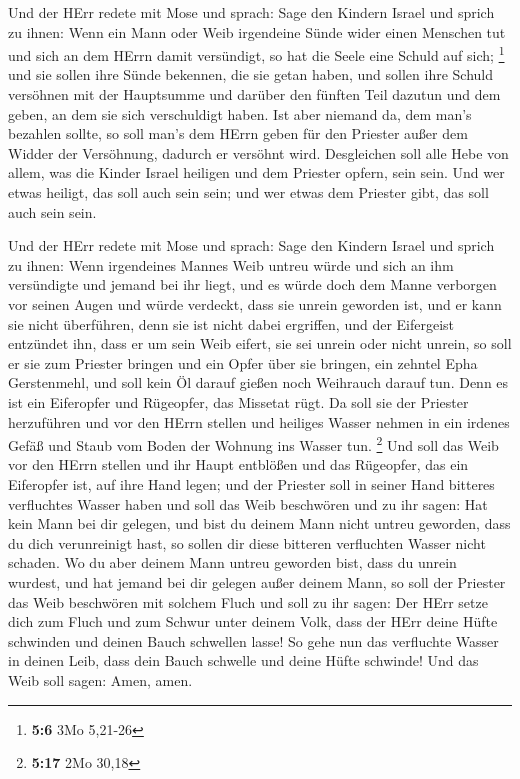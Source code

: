  Und der HErr redete mit Mose und sprach:  Sage
den Kindern Israel und sprich zu ihnen: Wenn ein Mann oder Weib
irgendeine Sünde wider einen Menschen tut und sich an dem HErrn damit
versündigt, so hat die Seele eine Schuld auf sich; \footnote{\textbf{5:6}
  3Mo 5,21-26}  und sie sollen ihre Sünde bekennen, die sie
getan haben, und sollen ihre Schuld versöhnen mit der Hauptsumme und
darüber den fünften Teil dazutun und dem geben, an dem sie sich
verschuldigt haben.  Ist aber niemand da, dem man's bezahlen
sollte, so soll man's dem HErrn geben für den Priester außer dem Widder
der Versöhnung, dadurch er versöhnt wird.  Desgleichen soll
alle Hebe von allem, was die Kinder Israel heiligen und dem Priester
opfern, sein sein.  Und wer etwas heiligt, das soll auch
sein sein; und wer etwas dem Priester gibt, das soll auch sein sein.

 Und der HErr redete mit Mose und sprach: 
Sage den Kindern Israel und sprich zu ihnen: Wenn irgendeines Mannes
Weib untreu würde und sich an ihm versündigte  und jemand
bei ihr liegt, und es würde doch dem Manne verborgen vor seinen Augen
und würde verdeckt, dass sie unrein geworden ist, und er kann sie nicht
überführen, denn sie ist nicht dabei ergriffen,  und der
Eifergeist entzündet ihn, dass er um sein Weib eifert, sie sei unrein
oder nicht unrein,  so soll er sie zum Priester bringen und
ein Opfer über sie bringen, ein zehntel Epha Gerstenmehl, und soll kein
Öl darauf gießen noch Weihrauch darauf tun. Denn es ist ein Eiferopfer
und Rügeopfer, das Missetat rügt.  Da soll sie der Priester
herzuführen und vor den HErrn stellen  und heiliges Wasser
nehmen in ein irdenes Gefäß und Staub vom Boden der Wohnung ins Wasser
tun. \footnote{\textbf{5:17} 2Mo 30,18}  Und soll das Weib
vor den HErrn stellen und ihr Haupt entblößen und das Rügeopfer, das ein
Eiferopfer ist, auf ihre Hand legen; und der Priester soll in seiner
Hand bitteres verfluchtes Wasser haben  und soll das Weib
beschwören und zu ihr sagen: Hat kein Mann bei dir gelegen, und bist du
deinem Mann nicht untreu geworden, dass du dich verunreinigt hast, so
sollen dir diese bitteren verfluchten Wasser nicht schaden.
 Wo du aber deinem Mann untreu geworden bist, dass du
unrein wurdest, und hat jemand bei dir gelegen außer deinem Mann,
 so soll der Priester das Weib beschwören mit solchem Fluch
und soll zu ihr sagen: Der HErr setze dich zum Fluch und zum Schwur
unter deinem Volk, dass der HErr deine Hüfte schwinden und deinen Bauch
schwellen lasse!  So gehe nun das verfluchte Wasser in
deinen Leib, dass dein Bauch schwelle und deine Hüfte schwinde! Und das
Weib soll sagen: Amen, amen.


